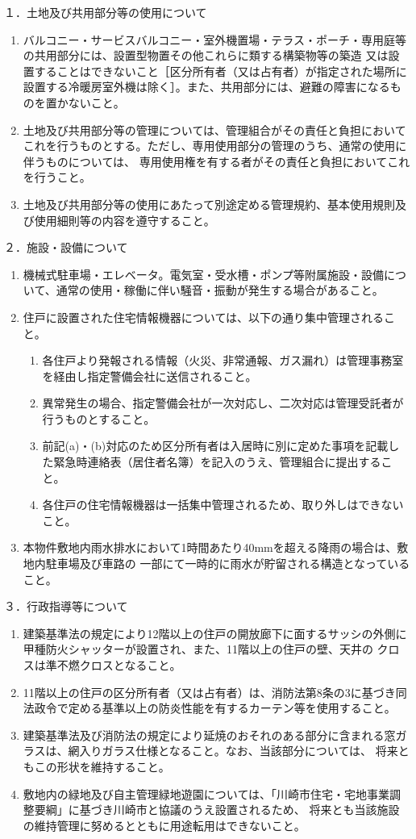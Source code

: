 \documentclass[
  luatex,
  paper=a4paper,
  fontsize=11pt,
  jafontsize=11pt,
  jlreq_notes,
]{jlreq}
\begin{document}
  \noindent
  １．土地及び共用部分等の使用について
  \begin{enumerate}
    \item バルコニー・サービスバルコニー・室外機置場・テラス・ポーチ・専用庭等の共用部分には、設置型物置その他これらに類する構築物等の築造
    又は設置することはできないこと［区分所有者（又は占有者）が指定された場所に設置する冷暖房室外機は除く］。また、共用部分には、避難の障害になるものを置かないこと。
    \item 土地及び共用部分等の管理については、管理組合がその責任と負担においてこれを行うものとする。ただし、専用使用部分の管理のうち、通常の使用に伴うものについては、
          専用使用権を有する者がその責任と負担においてこれを行うこと。
    \item 土地及び共用部分等の使用にあたって別途定める管理規約、基本使用規則及び使用細則等の内容を遵守すること。
  \end{enumerate}
  ２．施設・設備について
  \begin{enumerate}
    \item 機械式駐車場・エレベータ。電気室・受水槽・ポンプ等附属施設・設備について、通常の使用・稼働に伴い騒音・振動が発生する場合があること。
    \item 住戸に設置された住宅情報機器については、以下の通り集中管理されること。
      \begin{enumerate}
        \item 各住戸より発報される情報（火災、非常通報、ガス漏れ）は管理事務室を経由し指定警備会社に送信されること。
        \item 異常発生の場合、指定警備会社が一次対応し、二次対応は管理受託者が行うものとすること。
        \item 前記(a)・(b)対応のため区分所有者は入居時に別に定めた事項を記載した緊急時連絡表（居住者名簿）を記入のうえ、管理組合に提出すること。
        \item 各住戸の住宅情報機器は一括集中管理されるため、取り外しはできないこと。
      \end{enumerate}
  \item 本物件敷地内雨水排水において1時間あたり40mmを超える降雨の場合は、敷地内駐車場及び車路の
        一部にて一時的に雨水が貯留される構造となっていること。
  \end{enumerate}
  ３．行政指導等について
  \begin{enumerate}
  \item 建築基準法の規定により12階以上の住戸の開放廊下に面するサッシの外側に甲種防火シャッターが設置され、また、11階以上の住戸の壁、天井の クロスは準不燃クロスとなること。
  \item 11階以上の住戸の区分所有者（又は占有者）は、消防法第8条の3に基づき同法政令で定める基準以上の防炎性能を有するカーテン等を使用すること。
  \item 建築基準法及び消防法の規定により延焼のおそれのある部分に含まれる窓ガラスは、網入りガラス仕様となること。なお、当該部分については、
        将来ともこの形状を維持すること。
  \item 敷地内の緑地及び自主管理緑地遊園については、「川崎市住宅・宅地事業調整要綱」に基づき川崎市と協議のうえ設置されるため、
        将来とも当該施設の維持管理に努めるとともに用途転用はできないこと。
  \end{enumerate}
\end{document}
